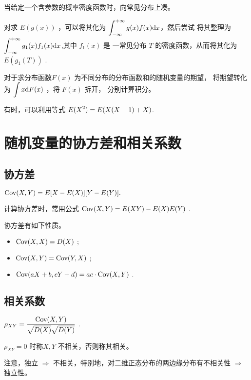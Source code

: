 
当给定一个含参数的概率密度函数时，向常见分布上凑。

对求 $ E(g(x)) $ ，可以将其化为 $ \displaystyle \int_{-\infty}^{+\infty}g(x)f(x)\mathrm{d}x $，然后尝试
将其整理为 $ \displaystyle \int_{-\infty}^{+\infty}g_1(x)f_1(x)\mathrm{d}x $,其中 $ f_1(x) $ 是
一常见分布 $ T $ 的密度函数，从而将其化为 $ E(g_1(T)) $ .

对于求分布函数$ F(x) $ 为不同分布的分布函数和的随机变量的期望，
将期望转化为 $ \displaystyle \int x\mathrm{d}F(x) $ ，将 $ F(x) $ 拆开，
分别计算积分。

有时，可以利用等式
$ \displaystyle E(X^2) = E(X(X-1)+X) $.

\section{随机变量的协方差和相关系数}

\subsection{协方差}

\begin{Def}[协方差]

    $ \textrm{Cov}(X,Y) = E[X-E(X)][Y-E(Y)]. $ 
\end{Def}

计算协方差时，常用公式
$ \displaystyle \textrm{Cov}(X,Y) = E(XY) - E(X)E(Y) $ .

协方差有如下性质。
\begin{itemize}
    \item $ \textrm{Cov}(X,X) = D(X) $ ;
    \item $ \textrm{Cov}(X,Y) = \textrm{Cov}(Y,X) $ ;
    \item $ \textrm{Cov}(aX+b,cY+d) = ac\cdot\textrm{Cov}(X,Y) $ .
\end{itemize}

\subsection{相关系数}

\begin{Def}[相关系数]

    $ \displaystyle \rho_{XY} = \dfrac{\textrm{Cov}(X,Y)}{\sqrt{D(X)}\sqrt{D(Y)}} $ .
\end{Def}

$ \rho_{XY} = 0 $ 时称$ X,Y $ 不相关，否则称其相关。

注意，独立 $ \Rightarrow $ 不相关，特别地，对二维正态分布的两边缘分布有不相关性 $ \Rightarrow $ 独立性。

